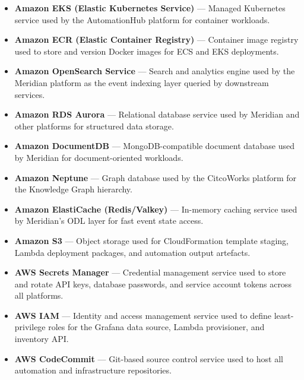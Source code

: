 \begin{itemize}
    \item \textbf{Amazon EKS (Elastic Kubernetes Service)} --- Managed
          Kubernetes service used by the AutomationHub platform for
          container workloads.

    \item \textbf{Amazon ECR (Elastic Container Registry)} --- Container
          image registry used to store and version Docker images for
          ECS and EKS deployments.

    \item \textbf{Amazon OpenSearch Service} --- Search and analytics
          engine used by the Meridian platform as the event indexing
          layer queried by downstream services.

    \item \textbf{Amazon RDS Aurora} --- Relational database service
          used by Meridian and other platforms for structured data storage.

    \item \textbf{Amazon DocumentDB} --- MongoDB-compatible document
          database used by Meridian for document-oriented workloads.

    \item \textbf{Amazon Neptune} --- Graph database used by the
          CitcoWorks platform for the Knowledge Graph hierarchy.

    \item \textbf{Amazon ElastiCache (Redis/Valkey)} --- In-memory
          caching service used by Meridian's ODL layer for fast
          event state access.

    \item \textbf{Amazon S3} --- Object storage used for CloudFormation
          template staging, Lambda deployment packages, and automation
          output artefacts.

    \item \textbf{AWS Secrets Manager} --- Credential management service
          used to store and rotate API keys, database passwords, and
          service account tokens across all platforms.

    \item \textbf{AWS IAM} --- Identity and access management service
          used to define least-privilege roles for the Grafana data
          source, Lambda provisioner, and inventory API.

    \item \textbf{AWS CodeCommit} --- Git-based source control service
          used to host all automation and infrastructure repositories.

\end{itemize}

